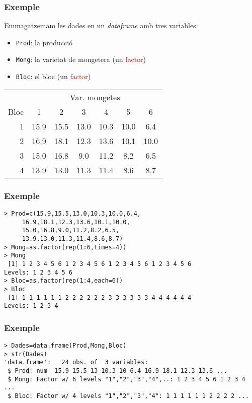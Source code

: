 \documentclass[12pt,t]{beamer}
\newcommand{\red}[1]{\textcolor{red}{#1}}
\theoremstyle{plain}
\theoremstyle{definition}
\begin{document}
\begin{frame}
\frametitle{Exemple}
Emmagatzemam les dades en  un \textsl{dataframe} amb tres variables:
\begin{itemize}
\item \texttt{Prod}: la producció
\item \texttt{Mong}: la varietat de mongetera (un \red{factor})
\item \texttt{Bloc}: el bloc (un \red{factor})
\end{itemize}


\begin{center}
\begin{tabular}{r|cccccc}
\multicolumn{1}{c}{} &  \multicolumn{6}{c}{Var. mongetes}\\
Bloc & 1 & 2 & 3 & 4 & 5 & 6\\ \hline
1 &  15.9  &  15.5  &  13.0  &  10.3  &  10.0  &   6.4\\
2 &   16.9  &  18.1  &  12.3  &  13.6   & 10.1  &  10.0\\
3 &   15.0  &  16.8   &  9.0   & 11.2   &  8.2    & 6.5\\
4 &   13.9  &  13.0  &  11.3  &  11.4 &    8.6   &  8.7\\
\end{tabular}
\end{center}
\end{frame}


\begin{frame}[fragile]
\frametitle{Exemple}


\begin{lstlisting}
> Prod=c(15.9,15.5,13.0,10.3,10.0,6.4,
     16.9,18.1,12.3,13.6,10.1,10.0,
     15.0,16.8,9.0,11.2,8.2,6.5,
     13.9,13.0,11.3,11.4,8.6,8.7)
> Mong=as.factor(rep(1:6,times=4))
> Mong
 [1] 1 2 3 4 5 6 1 2 3 4 5 6 1 2 3 4 5 6 1 2 3 4 5 6
Levels: 1 2 3 4 5 6
> Bloc=as.factor(rep(1:4,each=6))
> Bloc
 [1] 1 1 1 1 1 1 2 2 2 2 2 2 3 3 3 3 3 3 4 4 4 4 4 4
Levels: 1 2 3 4
\end{lstlisting}
\end{frame}


\begin{frame}[fragile]
\frametitle{Exemple}


\begin{lstlisting}
> Dades=data.frame(Prod,Mong,Bloc)
> str(Dades)
'data.frame':	24 obs. of  3 variables:
 $ Prod: num  15.9 15.5 13 10.3 10 6.4 16.9 18.1 12.3 13.6 ...
 $ Mong: Factor w/ 6 levels "1","2","3","4",..: 1 2 3 4 5 6 1 2 3 4 ...
 $ Bloc: Factor w/ 4 levels "1","2","3","4": 1 1 1 1 1 1 2 2 2 2 ...
\end{lstlisting}
\end{frame}
\end{document}
